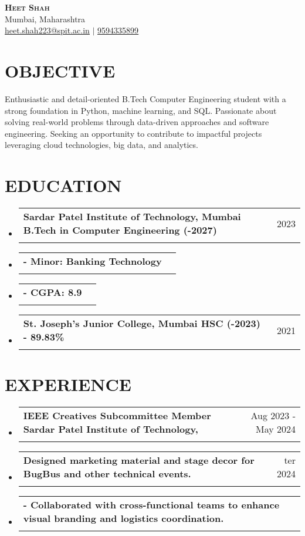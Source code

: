 \documentclass[letterpaper,11pt]{article}
\makeatletter
\newcommand{\resumeSubheading}[4]{
  \item
    \begin{tabular*}{0.97\textwidth}[t]{l@{\extracolsep{\fill}}r}
      \textbf{#1} & #2 \\
      \textit{\small#3} & \textit{\small#4} \\
    \end{tabular*}\vspace{-5pt}
}
\newcommand{\resumeSubHeadingListStart}{\begin{itemize}[leftmargin=0.15in, label={}]}
\newcommand{\resumeSubHeadingListEnd}{\end{itemize}}
\makeatother
\begin{document}
\begin{center}
    \textbf{\Huge \scshape Heet Shah} \\ \vspace{1pt}
    \small Mumbai, Maharashtra \\ \vspace{2pt}
    \small \href{mailto:heet.shah223@spit.ac.in}{\underline{heet.shah223@spit.ac.in}} $|$ 
    \href{tel:9594335899}{\underline{9594335899}}
\end{center}

\section{OBJECTIVE}
Enthusiastic and detail-oriented B.Tech Computer Engineering student with a strong foundation in Python, machine learning, and SQL. Passionate about solving real-world problems through data-driven approaches and software engineering. Seeking an opportunity to contribute to impactful projects leveraging cloud technologies, big data, and analytics.

\section{EDUCATION}
\resumeSubHeadingListStart
\resumeSubheading{Sardar Patel Institute of Technology, Mumbai B.Tech in Computer Engineering (-2027)}{2023}{}{}
\resumeSubheading{- Minor: Banking Technology}{}{}{}
\resumeSubheading{- CGPA: 8.9}{}{}{}
\resumeSubheading{St. Joseph's Junior College, Mumbai HSC (-2023) - 89.83\%}{2021}{}{}
\resumeSubHeadingListEnd

\section{EXPERIENCE}
\resumeSubHeadingListStart
\resumeSubheading{IEEE Creatives Subcommittee Member Sardar Patel Institute of Technology,}{Aug 2023 - May 2024}{}{}
\resumeSubheading{Designed marketing material and stage decor for BugBus and other technical events.}{ter 2024}{}{}
\resumeSubheading{- Collaborated with cross-functional teams to enhance visual branding and logistics coordination.}{}{}{}
\resumeSubHeadingListEnd
\end{document}
